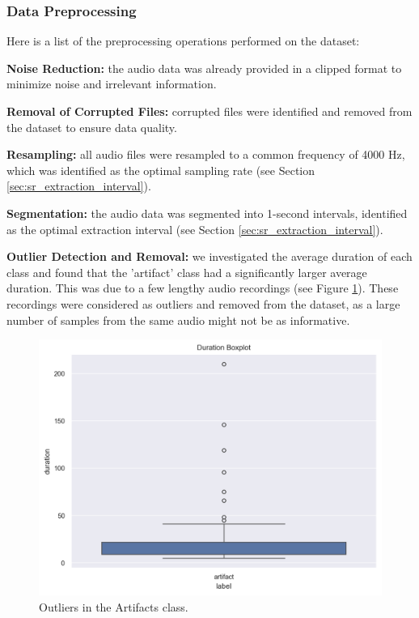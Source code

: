 \documentclass[twocolumn]{class}
\begin{document}
\subsubsection{Data Preprocessing}
Here is a list of the preprocessing operations performed on the dataset:

\vspace{0.3cm}\noindent
\textbf{Noise Reduction:} the audio data was already provided in a clipped format 
to minimize noise and irrelevant information.

\vspace{0.3cm}\noindent
\textbf{Removal of Corrupted Files:} corrupted files were identified and removed 
from the dataset to ensure data quality.

\vspace{0.3cm}\noindent
\textbf{Resampling:} all audio files were resampled to a common frequency of 4000 Hz, 
which was identified as the optimal sampling rate (see Section \ref{sec:sr_extraction_interval}).

\vspace{0.3cm}\noindent
\textbf{Segmentation:} the audio data was segmented into 1-second intervals, 
identified as the optimal extraction interval (see Section \ref{sec:sr_extraction_interval}).

\vspace{0.3cm}\noindent
\textbf{Outlier Detection and Removal:} we investigated the average duration of 
each class and found that the 'artifact' class had a significantly larger average 
duration. This was due to a few lengthy audio 
recordings (see Figure \ref{fig:DataExp_outliers_Artifacts}). These recordings were 
considered as outliers and removed from the dataset, as a large number of samples from 
the same audio might not be as informative.

\begin{figure}[H]
	\centering
	\includegraphics[width=1\columnwidth]{./images/DataExp_outliers_artifact.png}
	\caption{Outliers in the Artifacts class.}
	\label{fig:DataExp_outliers_Artifacts}
 \end{figure}
\end{document}

